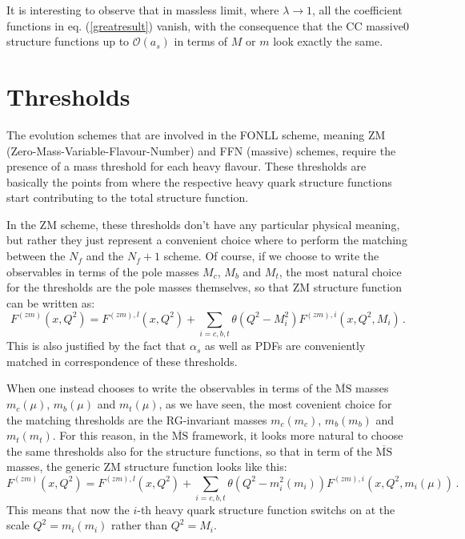 \documentclass[10pt,a4paper]{article}
\begin{document}
It is interesting to observe that in massless limit, where $\lambda\rightarrow 1$, all the coefficient functions in eq. (\ref{greatresult}) vanish, with the consequence that the CC massive0 structure functions up to $\mathcal{O}(a_s)$ in terms of $M$ or $m$ look exactly the same.

\section{Thresholds}

The evolution schemes that are involved in the FONLL scheme, meaning ZM (Zero-Mass-Variable-Flavour-Number) and FFN (massive) schemes, require the presence of a mass threshold for each heavy flavour. These thresholds are basically the points from where the respective heavy quark structure functions start contributing to the total structure function.

In the ZM scheme, these thresholds don't have any particular physical meaning, but rather they just represent a convenient choice where to perform the matching between the $N_f$ and the $N_f+1$ scheme. Of course, if we choose to write the observables in terms of the pole masses $M_c$, $M_b$ and $M_t$, the most natural choice for the thresholds are the pole masses themselves, so that ZM structure function can be written as:
\begin{equation}
F^{(zm)}(x,Q^2) = F^{(zm),l}(x,Q^2)+\sum_{i=c,b,t}\theta(Q^2-M_i^2)F^{(zm),i}(x,Q^2,M_i)\,.
\end{equation}
This is also justified by the fact that $\alpha_s$ as well as PDFs are conveniently matched in correspondence of these thresholds.

When one instead chooses to write the observables in terms of the $\overline{\mbox{MS}}$ masses $m_c(\mu)$, $m_b(\mu)$ and $m_t(\mu)$, as we have seen, the most covenient choice for the matching thresholds are the RG-invariant masses  $m_c(m_c)$, $m_b(m_b)$ and $m_t(m_t)$. For this reason, in the $\overline{\mbox{MS}}$ framework, it looks more natural to choose the same thresholds also for the structure functions, so that in term of the $\overline{\mbox{MS}}$ masses, the generic ZM structure function looks like this:
\begin{equation}
F^{(zm)}(x,Q^2) = F^{(zm),l}(x,Q^2)+\sum_{i=c,b,t}\theta(Q^2-m_i^2(m_i))F^{(zm),i}(x,Q^2,m_i(\mu))\,.
\end{equation}
This means that now the $i$-th heavy quark structure function switchs on at the scale $Q^2=m_i(m_i)$ rather than $Q^2=M_i$.
\end{document}
